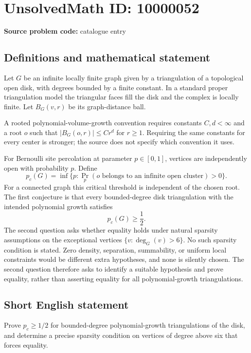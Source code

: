 \documentclass[11pt]{article}
\begin{document}
\section*{UnsolvedMath ID: 10000052}
\textbf{Source problem code:} catalogue entry
\subsection{Definitions and mathematical statement}
Let $G$ be an infinite locally finite graph given by a triangulation of a topological open disk, with degrees bounded by a finite constant. In a standard proper triangulation model the triangular faces fill the disk and the complex is locally finite. Let $B_G(v,r)$ be its graph-distance ball.

A rooted polynomial-volume-growth convention requires constants $C,d<\infty$ and a root $o$ such that $|B_G(o,r)|\leq Cr^d$ for $r\geq1$. Requiring the same constants for every center is stronger; the source does not specify which convention it uses.

For Bernoulli site percolation at parameter $p\in[0,1]$, vertices are independently open with probability $p$. Define
\[
p_c(G)=\inf\{p:\Pr_p(o\text{ belongs to an infinite open cluster})>0\}.
\]
For a connected graph this critical threshold is independent of the chosen root. The first conjecture is that every bounded-degree disk triangulation with the intended polynomial growth satisfies
\[
p_c(G)\geq\frac12.
\]
The second question asks whether equality holds under natural sparsity assumptions on the exceptional vertices $\{v:\deg_G(v)>6\}$. No such sparsity condition is stated. Zero density, separation, summability, or uniform local constraints would be different extra hypotheses, and none is silently chosen. The second question therefore asks to identify a suitable hypothesis and prove equality, rather than asserting equality for all polynomial-growth triangulations.
\subsection{Short English statement}
Prove $p_c\geq1/2$ for bounded-degree polynomial-growth triangulations of the disk, and determine a precise sparsity condition on vertices of degree above six that forces equality.
\end{document}
